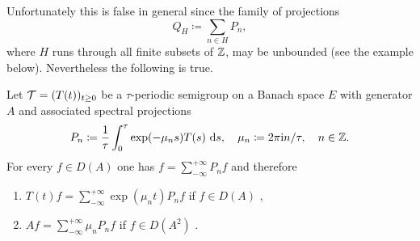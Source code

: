 Unfortunately this is false in general since the family of projections
\[
Q_{H} \coloneqq \sum_{n \in H} P_{n} ,
\]
where $H$ runs through all finite subsets of $\mathbb{Z}$, may be unbounded (see the example below).
Nevertheless the following is true.
\begin{theorem}\label{thm:a3-5.4}
Let $\mathcal{T} = (T(t))_{t \geq 0}$ be a $\tau$-periodic semigroup on a Banach space $E$ with generator $A$ and associated spectral projections
\[
P_{n} \coloneqq  \frac{1}{\tau}\int_{0}^{\tau} \exp(-\mu_{n}s)T(s) \, \mathop{}\!\mathrm{d}{s}, \quad \mu_{n} \coloneqq 2\pi\mathrm{i} n/\tau, \quad n \in \mathbb{Z}  .
\]
For every $f \in D(A)$ one has $f = \sum_{-\infty}^{+\infty} P_{n}f$ and therefore
\begin{enumerate}[\upshape (i)]
\item 
$T(t)f = \sum_{-\infty}^{+\infty} \exp(\mu_{n}t)P_{n}f$ \quad if $f \in D(A)$ ,

\item 
$Af = \sum_{-\infty}^{+\infty} \mu_{n}P_{n}f$ \quad if $f \in D(A^{2})$ .
\end{enumerate}
\end{theorem}

